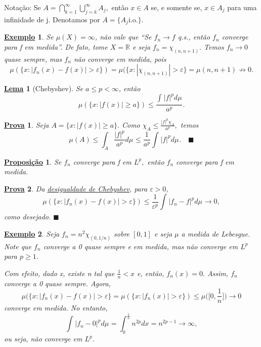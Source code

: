\documentclass{article}
\newtheorem*{lemma*}{\underline{Lema}}
\newtheorem*{prop*}{\underline{Proposi\c c\~ao}}
\newtheorem{example}{\underline{Exemplo}}
\newtheorem*{proof*}{\underline{Prova}}
\renewcommand\qedsymbol{$\blacksquare$}
\begin{document}
  Notação: Se \(A = \bigcap_{k=1}^{\infty}\bigcup_{j=k}^{\infty}A_{j},\) então \(x\in A\) se, e somente se, \(x\in A_{j}\) para uma infinidade de j. Denotamos por \(A = \{A_{j}\mathrm{i.o.}\}.\)
\begin{example}
  Se \(\mu (X) = \infty\), não vale que ``Se \(f_{n}\to f\) q.s., então \(f_{n}\) converge para f em medida''. De fato, tome \(X = \mathbb{R}\) e seja \(f_{n} = \chi_{(n, n+1)}.\) Temos \(f_{n}\to 0\) quase sempre, mas \(f_{n}\) não converge em medida, pois 
    \[
      \mu (\{x: |f_{n}(x) - f(x)|> \varepsilon \}) = \mu (\{x: |\chi_{(n, n+1)}| > \varepsilon \} = \mu (n, n+1)\not\to 0.
    \]
\end{example}
 \hypertarget{chebyshev}{
   \begin{lemma*}[Chebyshev]
    Se \(a\leq p < \infty\), então 
      \[
        \mu (\{x: |f(x)| \geq a\}) \leq \frac{\int_{}|f|^{p} d\mu_{}}{a^{p}}.
      \]
 \end{lemma*}}
 \begin{proof*}
   Seja \(A = \{x: |f(x)| \geq a\}.\) Como \(\chi_{A} \leq \frac{|f|^{p}\chi_{A}}{a^{p}},\) temos 
     \[
       \mu (A) \leq \int_{A}\frac{|f|^{p}}{a^{p}} d\mu_{} \leq \frac{1}{a^{p}}\int_{}|f|^{p} d\mu_{}. \quad \text{\qedsymbol}
     \]
 \end{proof*}
\begin{prop*}
  Se \(f_{n}\) converge para f em \(L^{p},\) então \(f_{n}\) converge para f em medida.
\end{prop*} 
\begin{proof*}
  Da \hyperlink{chebyshev}{\textit{desigualdade de Chebyshev}}, para \(\varepsilon >0\), 
    \[
      \mu (\{x: |f_{n}(x) - f(x)| > \varepsilon \}) \leq \frac{1}{\varepsilon ^{p}}\int_{}|f_{n}-f|^{p} d\mu_{}\to 0,
    \]
  como desejado. \qedsymbol
\end{proof*}
\begin{example}
  Seja \(f_{n} = n^{2}\chi_{(0, 1/n)}\) sobre \([0, 1]\) e seja \(\mu \) a medida de Lebesgue. Note que \(f_{n}\) converge a 0 quase sempre e em medida, mas não converge em \(L^{p}\) para \(p \geq 1\).

  Com efeito, dado x, existe n tal que \(\frac{1}{n} < x\) e, então, \(f_{n}(x) = 0.\) Assim, \(f_{n}\) converge a 0 quase sempre. Agora, 
    \[
      \mu (\{x: |f_{n}(x) - f(x)| > \varepsilon \} = \mu (\{x: |f_{n}(x)| > \varepsilon \}) \leq \mu \biggl(\biggl[0, \frac{1}{n}\biggr]\biggr)\to 0
    \]
  converge em medida. No entanto, 
    \[
      \int_{}|f_{n}-0|^{p} d\mu_{} = \int_{0}^{\frac{1}{n}}n^{2p}dx = n^{2p-1}\to \infty,
    \]
  ou seja, não converge em \(L^{p}.\)
\end{example}
\end{document}
